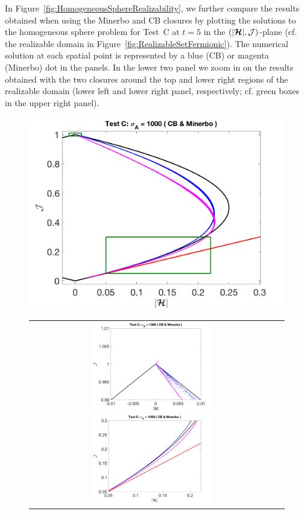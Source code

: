 In Figure~\ref{fig:HomogeneousSphereRealizability}, we further compare the results obtained when using the Minerbo and CB closures by plotting the solutions to the homogeneous sphere problem for Test~C at $t=5$ in the $(|\boldsymbol{\mathcal{H}}|,\mathcal{J})$-plane (cf. the realizable domain in Figure~\ref{fig:RealizableSetFermionic}).  
The numerical solution at each spatial point is represented by a blue (CB) or magenta (Minerbo) dot in the panels.  
In the lower two panel we zoom in on the results obtained with the two closures around the top and lower right regions of the realizable domain (lower left and lower right panel, respectively; cf. green boxes in the upper right panel).  
\begin{figure}[H]
  \centering
  \includegraphics[width=1.0\textwidth]{figures/HomogeneousSphere_Realizability_Chi_1e3_CBandMinerbo}
  \begin{tabular}{cc}
    \includegraphics[width=0.5\textwidth]{figures/HomogeneousSphere_Realizability_Chi_1e3_CBandMinerbo_Box1}
    \includegraphics[width=0.5\textwidth]{figures/HomogeneousSphere_Realizability_Chi_1e3_CBandMinerbo_Box2}

\end{tabular}
\end{figure}
